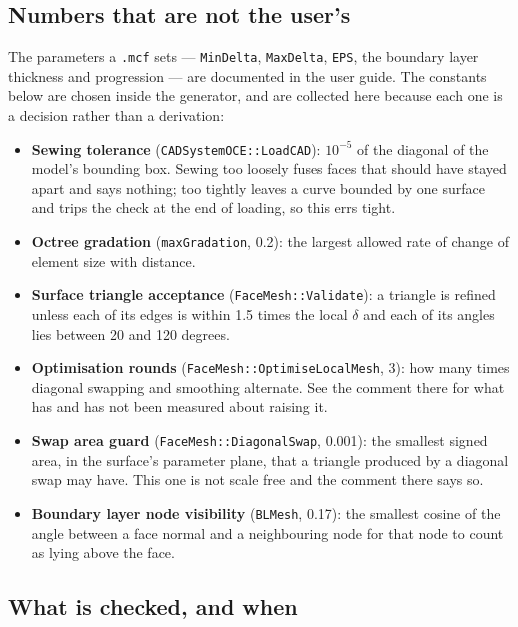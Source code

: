 {\subsection{Numbers that are not the user's}

The parameters a \texttt{.mcf} sets --- \texttt{MinDelta},
\texttt{MaxDelta}, \texttt{EPS}, the boundary layer thickness and
progression --- are documented in the user guide. The constants below are
chosen inside the generator, and are collected here because each one is a
decision rather than a derivation:

\begin{itemize}
\item \textbf{Sewing tolerance} (\texttt{CADSystemOCE::LoadCAD}): $10^{-5}$
  of the diagonal of the model's bounding box. Sewing too loosely fuses faces
  that should have stayed apart and says nothing; too tightly leaves a curve
  bounded by one surface and trips the check at the end of loading, so this
  errs tight.

\item \textbf{Octree gradation} (\texttt{maxGradation}, 0.2): the largest
  allowed rate of change of element size with distance.

\item \textbf{Surface triangle acceptance} (\texttt{FaceMesh::Validate}): a
  triangle is refined unless each of its edges is within 1.5 times the local
  $\delta$ and each of its angles lies between 20 and 120 degrees.

\item \textbf{Optimisation rounds} (\texttt{FaceMesh::OptimiseLocalMesh}, 3):
  how many times diagonal swapping and smoothing alternate. See the comment
  there for what has and has not been measured about raising it.

\item \textbf{Swap area guard} (\texttt{FaceMesh::DiagonalSwap}, 0.001): the
  smallest signed area, in the surface's parameter plane, that a triangle
  produced by a diagonal swap may have. This one is not scale free and the
  comment there says so.

\item \textbf{Boundary layer node visibility} (\texttt{BLMesh}, 0.17): the
  smallest cosine of the angle between a face normal and a neighbouring node
  for that node to count as lying above the face.
\end{itemize}

\subsection{What is checked, and when}

}

